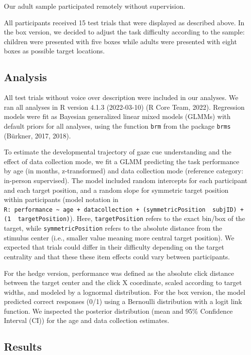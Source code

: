 \documentclass[
  man,floatsintext]{apa6}
\begin{document}
Our adult sample participated remotely without supervision.

All participants received 15 test trials that were displayed as described above. In the box version, we decided to adjust the task difficulty according to the sample: children were presented with five boxes while adults were presented with eight boxes as possible target locations.

\hypertarget{analysis}{%
\subsection{Analysis}\label{analysis}}

All test trials without voice over description were included in our analyses.
We ran all analyses in R version 4.1.3 (2022-03-10) (R Core Team, 2022).
Regression models were fit as Bayesian generalized linear mixed models (GLMMs) with default priors for all analyses, using the function \texttt{brm} from the package \texttt{brms} (Bürkner, 2017, 2018).

To estimate the developmental trajectory of gaze cue understanding and the effect of data collection mode, we fit a GLMM predicting the task performance by age (in months, z-transformed) and data collection mode (reference category: in-person supervised). The model included random intercepts for each participant and each target position, and a random slope for symmetric target position within participants (model notation in \texttt{R:\ performance\ \textasciitilde{}\ age\ +\ datacollection\ +\ (symmetricPosition\ \textbar{}\ subjID)\ +\ (1\ \textbar{}\ targetPosition)}). Here, \texttt{targetPosition} refers to the exact bin/box of the target, while \texttt{symmetricPosition} refers to the absolute distance from the stimulus center (i.e., smaller value meaning more central target position). We expected that trials could differ in their difficulty depending on the target centrality and that these these item effects could vary between participants.

For the hedge version, performance was defined as the absolute click distance between the target center and the click X coordinate, scaled according to target widths, and modeled by a lognormal distribution.
For the box version, the model predicted correct responses (0/1) using a Bernoulli distribution with a logit link function.
We inspected the posterior distribution (mean and 95\% Confidence Interval (CI)) for the age and data collection estimates.

\hypertarget{results}{%
\subsection{Results}\label{results}}
\end{document}
